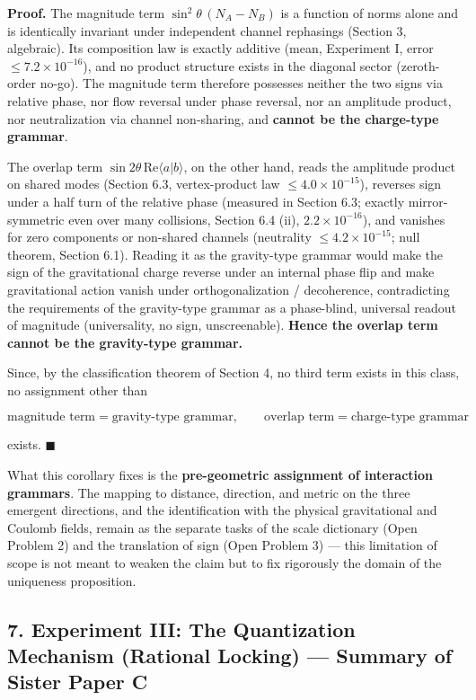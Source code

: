 \documentclass[
  a4paper,
]{article}
\begin{document}
\textbf{Proof.} The magnitude term \(\sin^2\theta\,(N_A-N_B)\) is a
function of norms alone and is identically invariant under independent
channel rephasings (Section 3, algebraic). Its composition law is
exactly additive (mean, Experiment I, error \(\le7.2\times10^{-16}\)),
and no product structure exists in the diagonal sector (zeroth-order
no-go). The magnitude term therefore possesses neither the two signs via
relative phase, nor flow reversal under phase reversal, nor an amplitude
product, nor neutralization via channel non-sharing, and \textbf{cannot
be the charge-type grammar}.

The overlap term \(\sin2\theta\,\mathrm{Re}\langle a|b\rangle\), on the
other hand, reads the amplitude product on shared modes (Section 6.3,
vertex-product law \(\le4.0\times10^{-15}\)), reverses sign under a half
turn of the relative phase (measured in Section 6.3; exactly
mirror-symmetric even over many collisions, Section 6.4 (ii),
\(2.2\times10^{-16}\)), and vanishes for zero components or non-shared
channels (neutrality \(\le4.2\times10^{-15}\); null theorem, Section
6.1). Reading it as the gravity-type grammar would make the sign of the
gravitational charge reverse under an internal phase flip and make
gravitational action vanish under orthogonalization / decoherence,
contradicting the requirements of the gravity-type grammar as a
phase-blind, universal readout of magnitude (universality, no sign,
unscreenable). \textbf{Hence the overlap term cannot be the gravity-type
grammar.}

Since, by the classification theorem of Section 4, no third term exists
in this class, no assignment other than

\[
\boxed{\text{magnitude term}=\text{gravity-type grammar},\qquad \text{overlap term}=\text{charge-type grammar}}
\]

exists. \(\blacksquare\)

What this corollary fixes is the \textbf{pre-geometric assignment of
interaction grammars}. The mapping to distance, direction, and metric on
the three emergent directions, and the identification with the physical
gravitational and Coulomb fields, remain as the separate tasks of the
scale dictionary (Open Problem 2) and the translation of sign (Open
Problem 3) --- this limitation of scope is not meant to weaken the claim
but to fix rigorously the domain of the uniqueness proposition.

\subsection{7. Experiment III: The Quantization Mechanism (Rational
Locking) --- Summary of Sister Paper
C}\label{experiment-iii-the-quantization-mechanism-rational-locking-summary-of-sister-paper-c}
\end{document}
